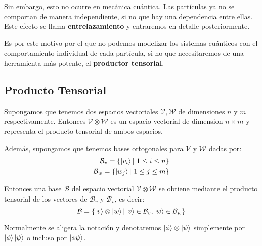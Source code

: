 Sin embargo, esto no ocurre en mecánica cuántica. Las partículas ya no se comportan de manera independiente, si no que hay una dependencia entre ellas. Este efecto se llama \textbf{entrelazamiento} y entraremos en detalle posteriormente. 

Es por este motivo por el que no podemos modelizar los sistemas cuánticos con el comportamiento individual de cada partícula, si no que necesitaremos de una herramienta más potente, el \textbf{productor tensorial}.

\subsection{Producto Tensorial}

Supongamos que tenemos dos espacios vectoriales $\mathcal{V},\mathcal{W}$ de dimensiones $n$ y $m$ respectivamente. Entonces $\mathcal{V}\otimes\mathcal{W}$ es un espacio vectorial de dimension $n\times m$ y representa el producto tensorial de ambos espacios.

Además, supongamos que tenemos bases ortogonales para $\mathcal{V}$ y $\mathcal{W}$ dadas por:
\begin{equation}
\begin{split}
\mathcal{B}_v =\{\left|v_i\right\rangle |\ 1 \leq i \leq n \} \\
\mathcal{B}_w =\{\left|w_j\right\rangle |\ 1 \leq j \leq m \}
\end{split}
\end{equation}

Entonces una base $\mathcal{B}$ del espacio vectorial $\mathcal{V}\otimes\mathcal{W}$ se obtiene mediante el producto tensorial de los vectores de $\mathcal{B}_v$  y $\mathcal{B}_v$, es decir:
\begin{equation}
\mathcal{B} = \{\left|v\right\rangle\otimes\left|w\right\rangle|\left|v\right\rangle\in\mathcal{B}_v,\left|w\right\rangle\in\mathcal{B}_w\}
\end{equation}

Normalmente se aligera la notación y denotaremos $\left|\phi\right\rangle\otimes\left|\psi\right\rangle$ simplemente por $\left|\phi\right\rangle\left|\psi\right\rangle$ o incluso por $\left|\phi\psi\right\rangle$.

